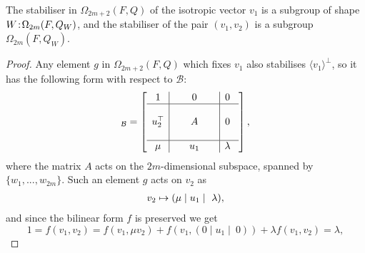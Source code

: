 \begin{lemma}
    \label{lemma:A_stabiliser_omega}
	The stabiliser in $\Omega_{2m+2}(F,Q)$ of the isotropic vector $v_1$ 
	is a subgroup of shape \mbox{$W\mathord{{\;\!{:}\;\!}}\Omega_{2m}(F,Q_W)$}, and the stabiliser of 
	the pair $(v_1,v_2)$ is a subgroup $\Omega_{2m}(F,Q_W)$.  
\end{lemma}

\begin{proof}
	Any element $g$ in $\Omega_{2m+2}(F,Q)$ which fixes $v_1$ also stabilises
    $\langle v_1 \rangle^{\perp}$, so it has the
    following form with respect to $\mathcal{B}$:
    \begin{equation*}
	[g]_{\mathcal{B}}=\left[
	    \begin{array}{c|c|c}
		1 & 0 & 0\  \\ \hline 
		 & & \\
		u_2^\T &\ \ \ \ \ A\ \ \ \ \  & 0\  \\ 
		 & & \\ \hline 
		\mu & u_1 & \lambda\ 
	    \end{array}
	\right],
    \end{equation*}
    where the matrix $A$ acts on the $2m$-dimensional subspace, 
    spanned by $\{w_1, ..., w_{2m}\}$. Such an element $g$ acts on $v_2$ as
    \begin{equation*}
	\begin{array}{r@{\;}c@{\;}l}
		v_2 & \mapsto & (\mu \mid u_1 \mid\ \lambda),
	\end{array}
    \end{equation*}
    and since the bilinear form $f$ is preserved we get
    \begin{equation*}
	1 = f(v_1,v_2) = f(v_1,\mu v_2) + 
	f(v_1, (0 \mid u_1 \mid\ 0) ) + \lambda f(v_1,v_2) = \lambda,
    \end{equation*}
    

\end{proof}

